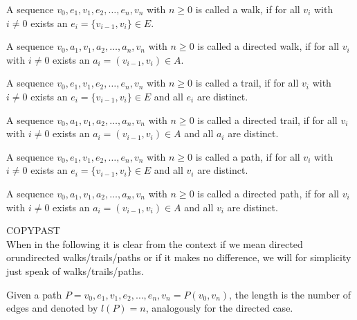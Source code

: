 \begin{definition}[Walk]
A sequence $v_0,e_1,v_1,e_2,\ldots ,e_n,v_n$ with $n \geq 0$ is called
a walk, if for all $v_i$ with $i \neq 0$ exists an $e_i = \{v_{i-1} , v_i \} \in E$.
\end{definition}

\begin{definition}
A sequence $v_0,a_1,v_1,a_2,\ldots ,a_n,v_n$ with $n \geq 0$ is called a directed walk, if for all $v_i$ with $i \neq 0$ exists an $a_i = (v_{i-1} , v_i ) \in A$.
\end{definition}

\begin{definition}[Trail]
A sequence $v_0,e_1,v_1,e_2,\dots ,e_n,v_n$ with $n \geq 0$ is called a trail, if for all $v_i$ with $i \neq 0$ exists an $e_i = \{v_{i-1}, v_i\} \in E$ and all $e_i$ are distinct.
\end{definition}

\begin{definition}
A sequence $v_0,a_1,v_1,a_2,\ldots ,a_n,v_n$ with $n \geq 0$ is called a directed trail, if for all $v_i$ with $i \neq 0$ exists an $a_i = (v_{i-1}, v_i) \in A$ and all $a_i$ are distinct.
\end{definition}

\begin{definition}[Path]
A sequence $v_0,e_1,v_1,e_2,\ldots , e_n,v_n$ with $n \geq 0$ is called a path, if for all $v_i$ with $i \neq 0$ exists an $e_i = \{v_{i-1} , v_i\} \in E$ and all $v_i$ are distinct.
\end{definition}

\begin{definition}
A sequence $v_0,a_1,v_1,a_2,\ldots ,a_n,v_n$ with $n \geq 0$ is called a directed path, if for all $v_i$ with $i \neq 0$ exists an $a_i = (v_{i-1}, v_i) \in A$ and all $v_i$ are distinct.
\end{definition}

COPYPAST\\
When in the following it is clear from the context if we mean directed orundirected walks/trails/paths or if it makes no difference, we will for simplicity just speak of walks/trails/paths.

\begin{definition}
Given a path $P = v_0,e_1,v_1,e_2,\ldots ,e_n,v_n = P(v_0,v_n)$, the length is the number of edges and denoted by $l(P) = n$, analogously for the directed case.
\end{definition}

